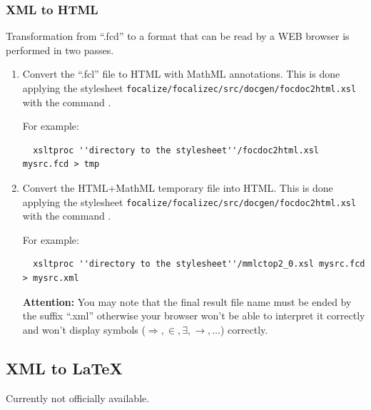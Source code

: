 \subsubsection{XML to HTML}
Transformation from ``.fcd'' to a format that can be read by a WEB
browser is performed in two passes.
\begin{enumerate}
  \item Convert the ``.fcl'' file to HTML with MathML annotations.
  This is done applying the stylesheet
  {\tt focalize/focalizec/src/docgen/focdoc2html.xsl} with the command
  \xsltproc.

  For example:
  {\scriptsize
  \begin{verbatim}
  xsltproc ''directory to the stylesheet''/focdoc2html.xsl mysrc.fcd > tmp
  \end{verbatim}
  }

  \item Convert the HTML+MathML temporary file into HTML.
  This is done applying the stylesheet
  {\tt focalize/focalizec/src/docgen/focdoc2html.xsl} with the command
  \xsltproc.

  For example:
  {\scriptsize
  \begin{verbatim}
  xsltproc ''directory to the stylesheet''/mmlctop2_0.xsl mysrc.fcd > mysrc.xml
  \end{verbatim}
  }
  \smallskip
  {\bf Attention:}
  You may note that the final result file name must be ended by the
  suffix ``.xml'' otherwise your browser won't be able to interpret it
  correctly and won't display symbols ($\Rightarrow, \in, \exists,
  \rightarrow, \ldots$) correctly.
\end{enumerate}



\subsection{XML to LaTeX}

Currently not officially available.
